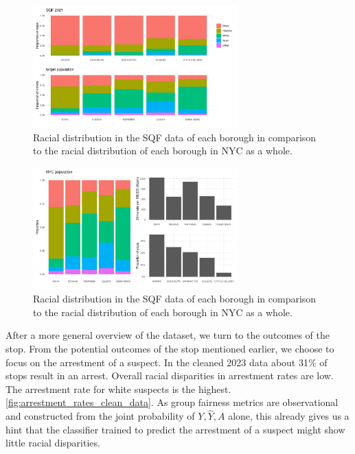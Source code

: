 \begin{figure}
    \centering
    \includegraphics[width=0.7\textwidth]{../figures/sqf_case_study_plot11.png}
    \caption{Racial distribution in the SQF data of each borough in comparison to the racial distribution of each borough in NYC as a whole.}
    \label{fig:racial_distribution_borough}
\end{figure}
\begin{figure}
    \centering
    \includegraphics[width=0.7\textwidth]{../figures/sqf_case_study_plot14.png}
    \caption{Racial distribution in the SQF data of each borough in comparison to the racial distribution of each borough in NYC as a whole.}
    \label{fig:nyc_pop_crimerates_stops_comparison}
\end{figure}

After a more general overview of the dataset, we turn to the outcomes of the stop. From the potential outcomes of the stop mentioned earlier, we choose to focus on the arrestment of a suspect. In the cleaned 2023 data about 31\% of stops result in an arrest.
Overall racial disparities in arrestment rates are low. The arrestment rate for white suspects is the highest. \autoref{fig:arrestment_rates_clean_data}. As group fairness metrics are observational and constructed from the joint probability of $Y, \hat{Y}, A$ alone, this already gives us a hint that the classifier trained to predict the arrestment of a suspect might show little racial disparities.

